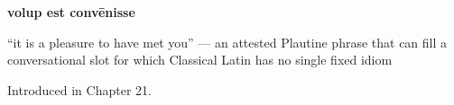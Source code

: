 \noindent\begin{minipage}[t]{\linewidth}
\raggedright
\textbf{volup est convēnisse}\par
\small \textquotedblleft{}it is a pleasure to have met you\textquotedblright{} — an attested Plautine phrase that can fill a conversational slot for which Classical Latin has no single fixed idiom\par
\footnotesize Introduced in Chapter 21.
\end{minipage}\par\medskip
